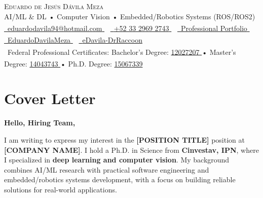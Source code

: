 \documentclass[letterpaper,10pt]{article}
\newcommand{\ExternalLink}{\textcolor{maincolor}{\scriptsize\textsuperscript{\faExternalLink*}}}
\newcommand{\PositionTitle}{[POSITION TITLE]} %
\newcommand{\CompanyName}{[COMPANY NAME]} %
\begin{document}
\begin{center}
    {\LARGE \scshape Eduardo de Jesús Dávila Meza} \\ \vspace{1pt} %
    \small AI/ML \& DL • Computer Vision • Embedded/Robotics Systems (ROS/ROS2) \\ %
    \vspace{2pt}%
    \footnotesize \href{mailto:eduardodavila94@hotmail.com}{\faEnvelope\  {eduardodavila94@hotmail.com} \ExternalLink} ~ 
    \href{https://wa.me/qr/DOKPRLEDLX77N1}{\faWhatsapp\ {+52 33 2969 2743} \ExternalLink} ~ 
    \href{https://edavila-drraccoon.github.io/portfolio_site/}{\faBriefcase\ {Professional Portfolio} \ExternalLink}  ~ 
    \href{https://www.linkedin.com/in/EduardoDavilaMeza/}{\faLinkedin\ {EduardoDavilaMeza} \ExternalLink}  ~
    \href{https://github.com/eDavila-DrRaccoon/}{\faGithub\ {eDavila-DrRaccoon} \ExternalLink} \\ \vspace{1pt} 
    \faGraduationCap\ Federal Professional Certificates: Bachelor's Degree: \href{https://cedulaprofesional.sep.gob.mx/cedula/indexAvanzada.action?idCedula=12027207&idProfesionista=12095369&token=F1E4F2D34C7A333C90517CA80AB1DB69999A4B8B}{12027207 \ExternalLink} • Master's Degree: \href{https://cedulaprofesional.sep.gob.mx/cedula/indexAvanzada.action?idCedula=14043743&idProfesionista=14115164&token=CB0863B7F0A46D831C2C3DC4A95E539B32668E3C}{14043743 \ExternalLink} • Ph.D. Degree: \href{https://cedulaprofesional.sep.gob.mx/cedula/indexAvanzada.action?idCedula=15067339&idProfesionista=15140505&token=17C9CA664BAAE1F40541558FFDF476D9C062828C}{15067339 \ExternalLink} \vspace{-8pt}
\end{center}

\vspace{0pt}

\large\section{Cover Letter}

\quad\newline
\justifying

\textbf{Hello, Hiring Team,}

\quad\newline
I am writing to express my interest in the \textbf{\PositionTitle} position at \textbf{\CompanyName}. I hold a Ph.D. in Science from \textbf{Cinvestav, IPN}, where I specialized in \textbf{deep learning and computer vision}. My background combines AI/ML research with practical software engineering and embedded/robotics systems development, with a focus on building reliable solutions for real-world applications.
\end{document}
